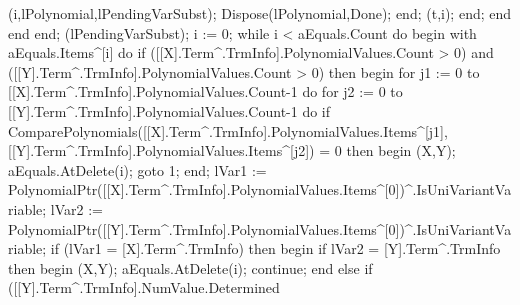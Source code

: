                           (i,lPolynomial,lPendingVarSubst);
                           Dispose(lPolynomial,Done);
                        end;
                        (t,i);
                     end;
                  end
               end
            end;
      (lPendingVarSubst);
      i := 0;
      while i < aEquals.Count do
      begin
         with aEquals.Items^[i] do
            if ([[X].Term^.TrmInfo].PolynomialValues.Count > 0) and
                  ([[Y].Term^.TrmInfo].PolynomialValues.Count > 0) then
            begin
               for j1 := 0 to [[X].Term^.TrmInfo].PolynomialValues.Count-1 do
                  for j2 := 0 to [[Y].Term^.TrmInfo].PolynomialValues.Count-1 do
                     if ComparePolynomials([[X].Term^.TrmInfo].PolynomialValues.Items^[j1],
                                           [[Y].Term^.TrmInfo].PolynomialValues.Items^[j2]) = 0 then
                     begin
                        (X,Y);
                        aEquals.AtDelete(i);
                        goto 1;
                     end;
               lVar1 := PolynomialPtr([[X].Term^.TrmInfo].PolynomialValues.Items^[0])^.IsUniVariantVariable;
               lVar2 := PolynomialPtr([[Y].Term^.TrmInfo].PolynomialValues.Items^[0])^.IsUniVariantVariable;
               if (lVar1 = [X].Term^.TrmInfo) then
               begin
                  if lVar2 = [Y].Term^.TrmInfo then
                  begin
                     (X,Y);
                     aEquals.AtDelete(i);
                     continue;
                  end
                  else if ([[Y].Term^.TrmInfo].NumValue.Determined

